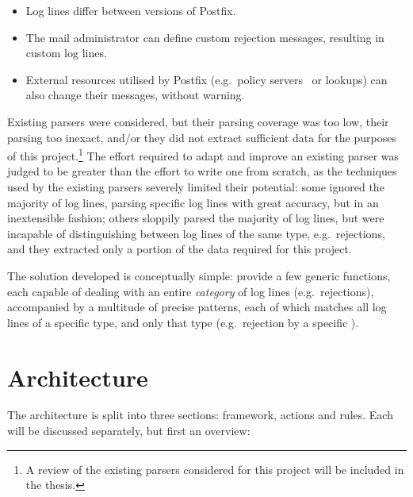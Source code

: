 \documentclass[draft]{svmult}
\begin{document}
\begin{itemize}

    \item Log lines differ between versions of Postfix.
        
    \item The mail administrator can define custom rejection messages,
        resulting in custom log lines.

    \item External resources utilised by Postfix (e.g.\ policy
        servers~\cite{policy-servers} or \RBL{} lookups) can also change
        their messages, without warning.

\end{itemize}

Existing parsers were considered, but their parsing coverage was too low,
their parsing too inexact, and/or they did not extract sufficient data for
the purposes of this project.\footnote{A review of the existing parsers
considered for this project will be included in the thesis.} The effort
required to adapt and improve an existing parser was judged to be greater
than the effort to write one from scratch, as the techniques used by the
existing parsers severely limited their potential: some ignored the
majority of log lines, parsing specific log lines with great accuracy, but
in an inextensible fashion; others sloppily parsed the majority of log
lines, but were incapable of distinguishing between log lines of the same
type, e.g.\ rejections, and they extracted only a portion of the data
required for this project.

The solution developed is conceptually simple: provide a few generic functions,
each capable of dealing with an entire \textit{category\/} of log lines (e.g.\
rejections), accompanied by a multitude of precise patterns, each of which
matches all log lines of a specific type, and only that type (e.g.\ rejection
by a specific \RBLshort{}).


\section{Architecture}

\label{Architecture}

The architecture is split into three sections: framework, actions and
rules.  Each will be discussed separately, but first an overview:
\end{document}
